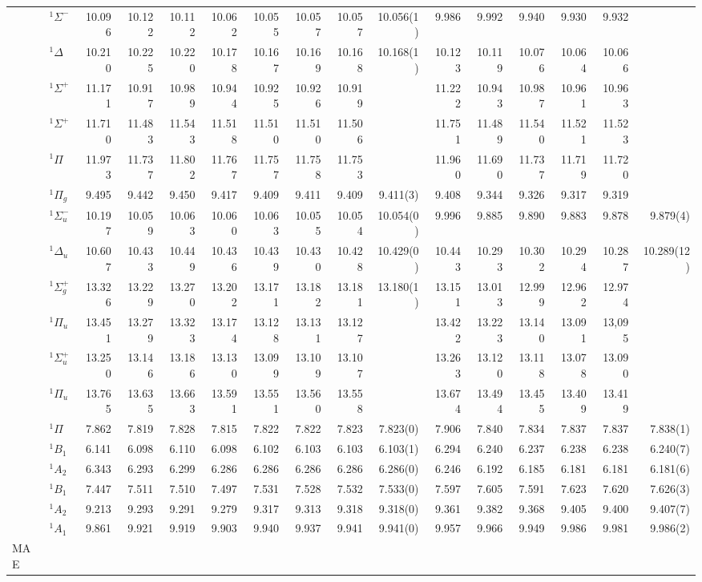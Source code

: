 \documentclass[aip,jcp,reprint,noshowkeys,superscriptaddress]{revtex4-1}
\begin{document}
\begin{squeezetable}
\begin{table*}
\begin{ruledtabular}
\begin{tabular}{llrrrrrrrrrrrrrr}
				&	$^1\Sigma^-$ 	&10.096	&10.122	&10.112	&10.062	&10.055	&10.057	&10.057	&10.056(1)	&9.986	&9.992	&9.940	&9.930	&9.932	&	\\
				&	$^1\Delta$ 		&10.210	&10.225	&10.220	&10.178	&10.167	&10.169	&10.168	&10.168(1)	&10.123	&10.119	&10.076	&10.064	&10.066	&	\\
				&	$^1\Sigma^+$ 	&11.171	&10.917	&10.989	&10.944	&10.925	&10.926	&10.919	&			&11.222	&10.943	&10.987	&10.961	&10.963	&	\\
				&	$^1\Sigma^+$ 	&11.710	&11.483	&11.543	&11.518	&11.510	&11.510	&11.506	&			&11.751	&11.489	&11.540	&11.521	&11.523	&	\\
				&	$^1\Pi$ 		&11.973	&11.737	&11.802	&11.767	&11.757	&11.758	&11.753	&			&11.960	&11.690	&11.737	&11.719	&11.720	&	\\
	\ce{N2}		&	$^1\Pi_g$  		&9.495	&9.442	&9.450	&9.417	&9.409	&9.411	&9.409	&9.411(3)	&9.408	&9.344	&9.326	&9.317	&9.319	&	\\
				&	$^1\Sigma_u^-$	&10.197	&10.059	&10.063	&10.060	&10.063	&10.055	&10.054	&10.054(0)	&9.996	&9.885	&9.890	&9.883	&9.878	&9.879(4)\\
				&	$^1\Delta_u$ 	&10.607	&10.433	&10.449	&10.436	&10.439	&10.430	&10.428	&10.429(0)	&10.443	&10.293	&10.302	&10.294	&10.287	&10.289(12)\\
				&	$^1\Sigma_g^+$	&13.326	&13.229	&13.270	&13.202	&13.171	&13.182	&13.181	&13.180(1)	&13.151	&13.013	&12.999	&12.962	&12.974	&	\\
				&	$^1\Pi_u$  		&13.451	&13.279	&13.323	&13.174	&13.128	&13.131	&13.127	&			&13.422	&13.223	&13.140	&13.091	&13,095	&	\\
				&	$^1\Sigma_u^+$	&13.250	&13.146	&13.186	&13.130	&13.099	&13.109	&13.107	&			&13.263	&13.120	&13.118	&13.078	&13.090	&	\\
				&	$^1\Pi_u$ 		&13.765	&13.635	&13.663	&13.591	&13.551	&13.560	&13.558	&			&13.674	&13.494	&13.455	&13.409	&13.419\\
	\ce{HCl}	&	$^1\Pi$ 		&7.862	&7.819	&7.828	&7.815	&7.822	&7.822	&7.823	&7.823(0)	&7.906	&7.840	&7.834	&7.837	&7.837	&7.838(1)\\
	\ce{H2S}	&	$^1B_1$  		&6.141	&6.098	&6.110	&6.098	&6.102	&6.103	&6.103	&6.103(1)	&6.294	&6.240	&6.237	&6.238	&6.238	&6.240(7)\\
				&	$^1A_2$  		&6.343	&6.293	&6.299	&6.286	&6.286	&6.286	&6.286	&6.286(0)	&6.246	&6.192	&6.185	&6.181	&6.181	&6.181(6) \\
	\ce{H2O}	&	$^1B_1$  		&7.447	&7.511	&7.510	&7.497	&7.531	&7.528	&7.532	&7.533(0)	&7.597	&7.605	&7.591	&7.623	&7.620	&7.626(3)\\
				&	$^1A_2$  		&9.213	&9.293	&9.291	&9.279	&9.317	&9.313	&9.318	&9.318(0)	&9.361	&9.382	&9.368	&9.405	&9.400	&9.407(7)\\
				&	$^1A_1$  		&9.861	&9.921	&9.919	&9.903	&9.940	&9.937	&9.941	&9.941(0)	&9.957	&9.966	&9.949	&9.986	&9.981	&9.986(2)\\
	\hline
	MAE			&					&	\\
	\end{tabular}
	\end{ruledtabular}
\end{table*}
\end{squeezetable}
\end{document}
